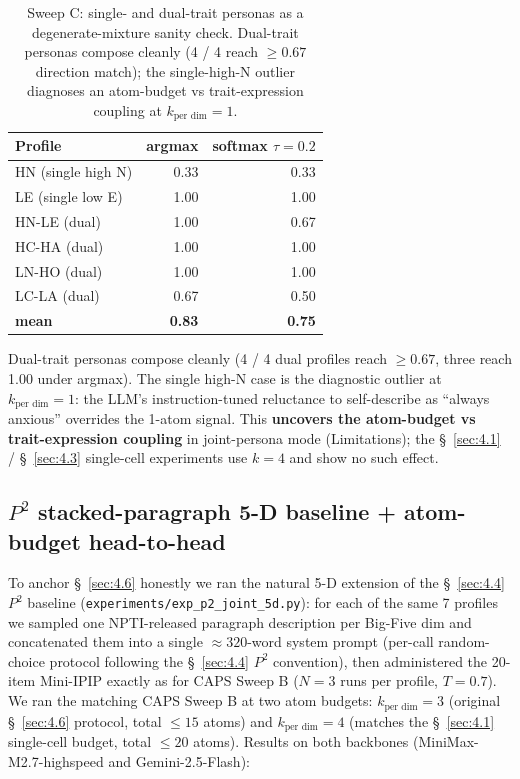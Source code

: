 \begin{table}[t]
\centering\small
\begin{tabular}{lrr}
\toprule
Profile & argmax & softmax $\tau{=}0.2$ \\
\midrule
HN (single high N) & 0.33 & 0.33 \\
LE (single low E) & 1.00 & 1.00 \\
HN-LE (dual) & 1.00 & 0.67 \\
HC-HA (dual) & 1.00 & 1.00 \\
LN-HO (dual) & 1.00 & 1.00 \\
LC-LA (dual) & 0.67 & 0.50 \\
\textbf{mean} & \textbf{0.83} & \textbf{0.75} \\
\bottomrule
\end{tabular}
\caption{Sweep C: single- and dual-trait personas as a degenerate-mixture sanity check. Dual-trait personas compose cleanly (4 / 4 reach $\geq 0.67$ direction match); the single-high-N outlier diagnoses an atom-budget vs trait-expression coupling at $k_\text{per dim} = 1$.}
\label{tab:joint-degenerate}
\end{table}

Dual-trait personas compose cleanly (4 / 4 dual profiles reach $\geq 0.67$, three reach 1.00 under argmax). The single high-N case is the diagnostic outlier at $k_\text{per dim} = 1$: the LLM's instruction-tuned reluctance to self-describe as ``always anxious'' overrides the 1-atom signal. This \textbf{uncovers the atom-budget vs trait-expression coupling} in joint-persona mode (Limitations); the \S~\ref{sec:4.1} / \S~\ref{sec:4.3} single-cell experiments use $k = 4$ and show no such effect.

\subsection{$P^{\!2}$ stacked-paragraph 5-D baseline + atom-budget head-to-head}
\label{app:C.4}

To anchor \S~\ref{sec:4.6} honestly we ran the natural 5-D extension of the \S~\ref{sec:4.4} $P^{\!2}$ baseline (\texttt{experiments/\allowbreak{}exp\_\allowbreak{}p2\_\allowbreak{}joint\_\allowbreak{}5d.py}): for each of the same 7 profiles we sampled one NPTI-released paragraph description per Big-Five dim and concatenated them into a single $\approx 320$-word system prompt (per-call random-choice protocol following the \S~\ref{sec:4.4} $P^{\!2}$ convention), then administered the 20-item Mini-IPIP exactly as for CAPS Sweep B ($N=3$ runs per profile, $T=0.7$). We ran the matching CAPS Sweep B at two atom budgets: $k_\text{per dim} = 3$ (original \S~\ref{sec:4.6} protocol, total $\leq 15$ atoms) and $k_\text{per dim} = 4$ (matches the \S~\ref{sec:4.1} single-cell budget, total $\leq 20$ atoms). Results on both backbones (MiniMax-M2.7-highspeed and Gemini-2.5-Flash):


